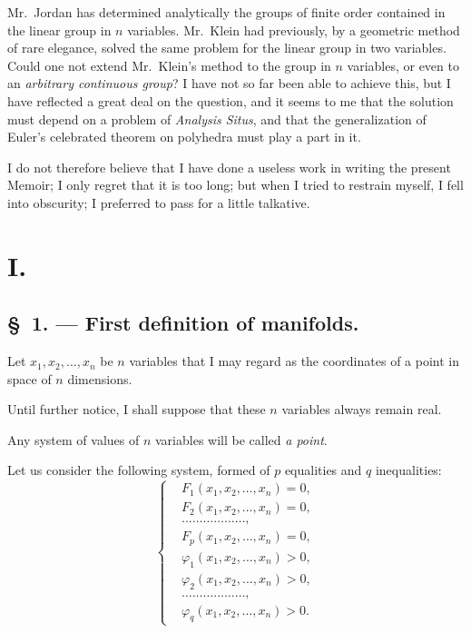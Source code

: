 \documentclass{article}
\begin{document}
Mr.~Jordan has determined analytically the groups of finite order contained in the linear group in $n$ variables. Mr.~Klein had previously, by a geometric method of rare elegance, solved the same problem for the linear group in two variables. Could one not extend Mr.~Klein's method to the group in $n$ variables, or even to an \emph{arbitrary continuous group}? I have not so far been able to achieve this, but I have reflected a great deal on the question, and it seems to me that the solution must depend on a problem of \emph{Analysis Situs}, and that the generalization of Euler's celebrated theorem on polyhedra must play a part in it.

I do not therefore believe that I have done a useless work in writing the present Memoir; I only regret that it is too long; but when I tried to restrain myself, I fell into obscurity; I preferred to pass for a little talkative.

\section*{I.}

\subsection*{\S~1. --- First definition of manifolds.}

Let $x_{1}, x_{2}, \ldots, x_{n}$ be $n$ variables that I may regard as the coordinates of a point in space of $n$ dimensions.

Until further notice, I shall suppose that these $n$ variables always remain real.

Any system of values of $n$ variables will be called \emph{a point}.

Let us consider the following system, formed of $p$ equalities and $q$ inequalities:
\[
\left\{
\begin{aligned}
&F_{1}(x_{1}, x_{2}, \ldots, x_{n}) = 0,\\
&F_{2}(x_{1}, x_{2}, \ldots, x_{n}) = 0,\\
&\ldots\ldots\ldots\ldots\ldots\ldots,\\
&F_{p}(x_{1}, x_{2}, \ldots, x_{n}) = 0,\\
&\varphi_{1}(x_{1}, x_{2}, \ldots, x_{n}) > 0,\\
&\varphi_{2}(x_{1}, x_{2}, \ldots, x_{n}) > 0,\\
&\ldots\ldots\ldots\ldots\ldots\ldots,\\
&\varphi_{q}(x_{1}, x_{2}, \ldots, x_{n}) > 0.
\end{aligned}
\right.
\tag{1}
\]
\end{document}
